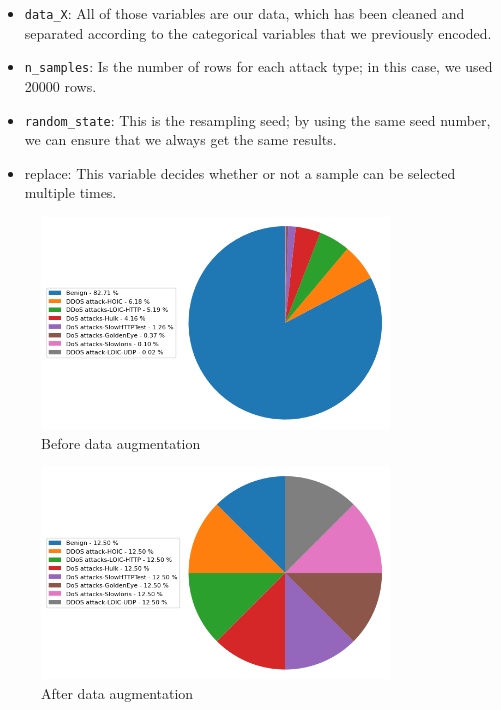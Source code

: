 



\begin{itemize}
	\item \texttt{data\_X}:  All of those variables are our data, which has been cleaned and separated according to the categorical variables that we previously encoded.
	\item \texttt{n\_samples}: Is the number of rows for each attack type; in this case, we used 20000 rows.
	\item \texttt{random\_state}: This is the resampling seed; by using the same seed number, we can ensure that we always get the same results.
	\item replace: This variable decides whether or not a sample can be selected multiple times.
\end{itemize}



\begin{figure}[h]
	\centering
	\includegraphics[width=350px]{figures/unbalanced_donut.png}
	\caption{Before data augmentation}
	\label{fig:datasample}
\end{figure}
\begin{figure}[h]
	\centering
	\includegraphics[width=350px]{figures/balanced_donut.png}
	\caption{After data augmentation}
	\label{fig:datasample}
\end{figure}

